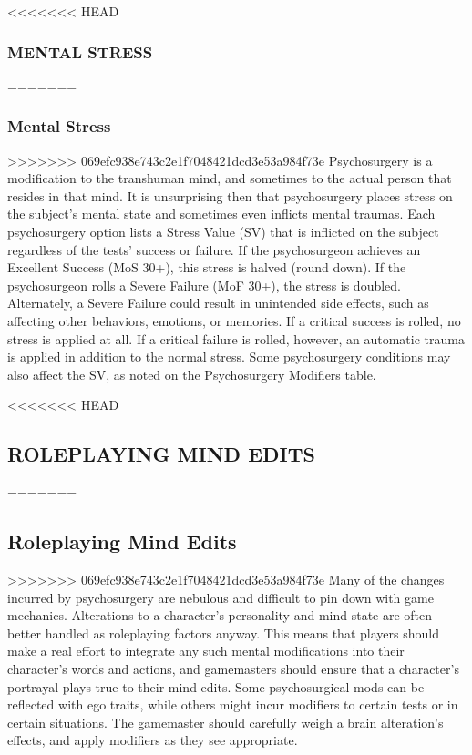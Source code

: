 <<<<<<< HEAD
\subsubsection{MENTAL STRESS}
=======
\subsubsection{Mental Stress}
>>>>>>> 069efc938e743c2e1f7048421dcd3e53a984f73e
Psychosurgery is a modification to the transhuman
mind, and sometimes to the actual person that resides
in that mind. It is unsurprising then that psychosurgery
places stress on the subject’s mental state and
sometimes even inflicts mental traumas.
Each psychosurgery option lists a Stress Value
(SV) that is inflicted on the subject regardless of
the tests’ success or failure. If the psychosurgeon
achieves an Excellent Success (MoS 30+), this stress
is halved (round down). If the psychosurgeon rolls
a Severe Failure (MoF 30+), the stress is doubled.
Alternately, a Severe Failure could result in unintended
side effects, such as affecting other behaviors,
emotions, or memories.
If a critical success is rolled, no stress is applied at
all. If a critical failure is rolled, however, an automatic
trauma is applied in addition to the normal stress.
Some psychosurgery conditions may also affect the
SV, as noted on the Psychosurgery Modifiers table.


<<<<<<< HEAD
\subsection{ROLEPLAYING MIND EDITS}
=======
\subsection{Roleplaying Mind Edits}
>>>>>>> 069efc938e743c2e1f7048421dcd3e53a984f73e
Many of the changes incurred by psychosurgery are
nebulous and difficult to pin down with game mechanics.
Alterations to a character’s personality and
mind-state are often better handled as roleplaying factors
anyway. This means that players should make a
real effort to integrate any such mental modifications
into their character’s words and actions, and gamemasters
should ensure that a character’s portrayal
plays true to their mind edits. Some psychosurgical
mods can be reflected with ego traits, while others
might incur modifiers to certain tests or in certain
situations. The gamemaster should carefully weigh a
brain alteration’s effects, and apply modifiers as they
see appropriate.


